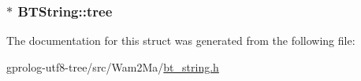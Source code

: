 \subsubsection[{\texorpdfstring{tree}{tree}}]{$\ast$ B\+T\+String\+::tree}\hypertarget{structBTString_a3d5e702b03b4afc55252841d531836f8}{}\label{structBTString_a3d5e702b03b4afc55252841d531836f8}


The documentation for this struct was generated from the following file\+:\begin{DoxyCompactItemize}
\item 
gprolog-\/utf8-\/tree/src/\+Wam2\+Ma/\hyperlink{bt__string_8h}{bt\+\_\+string.\+h}\end{DoxyCompactItemize}
